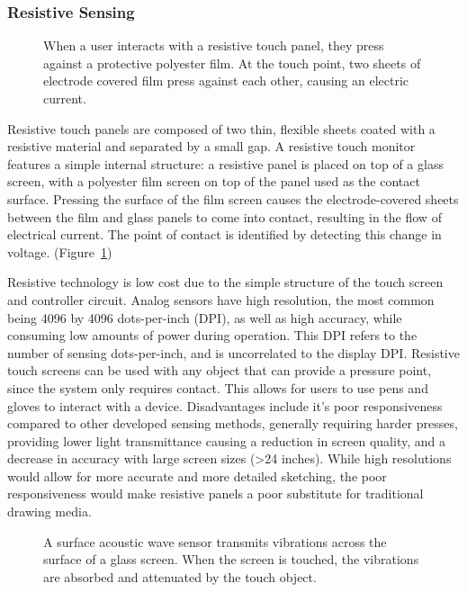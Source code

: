\subsubsection{Resistive Sensing}
\begin{figure}
	\centering
	\caption[A diagram of a resistive touch sensor] {When a user interacts with a resistive touch panel, they press against a protective polyester film. At the touch point, two sheets of electrode covered film press against each other, causing an electric current. \cite{touchtech}} 
	\label{fig:resistivetouch}
\end{figure}
Resistive touch panels are composed of two thin, flexible sheets coated with a resistive material and separated by a small gap.
A resistive touch monitor features a simple internal structure: a resistive panel is placed on top of a glass screen, with a polyester film screen on top of the panel used as the contact surface. 
Pressing the surface of the film screen causes the electrode-covered sheets between the film and glass panels to come into contact, resulting in the flow of electrical current. 
The point of contact is identified by detecting this change in voltage. (Figure~\ref{fig:resistivetouch})

Resistive technology is low cost due to the simple structure of the touch screen and controller circuit.
Analog sensors have high resolution, the most common being 4096 by 4096 dots-per-inch (DPI), as well as high accuracy, while consuming low amounts of power during operation.
This DPI refers to the number of sensing dots-per-inch, and is uncorrelated to the display DPI.
Resistive touch screens can be used with any object that can provide a pressure point, since the system only requires contact. 
This allows for users to use pens and gloves to interact with a device.
Disadvantages include it's poor responsiveness compared to other developed sensing methods, generally requiring harder presses, providing lower light transmittance causing a reduction in screen quality, and a decrease in accuracy with large screen sizes (\textgreater 24 inches).
While high resolutions would allow for more accurate and more detailed sketching, the poor responsiveness would make resistive panels a poor substitute for traditional drawing media.

\begin{center}
\begin{figure}
\caption[A diagram of a surface acoustic wave sensor] {A surface acoustic wave sensor transmits vibrations across the surface of a glass screen. When the screen is touched, the vibrations are absorbed and attenuated by the touch object. \cite{touchtech}}
\label{fig:sawsensing}
\end{figure}
\end{center}
 
